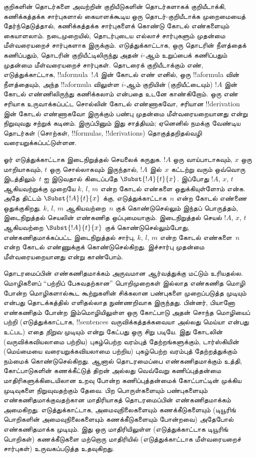 \documentclass[../../../include/open-logic-section]{subfiles}
\begin{document}
குறிகளின் தொடர்களை அவற்றின் குறியீடுகளின் தொடர்களாகக் குறியீடாக்கி,
கணிக்கத்தக்க சார்புகளால் கையாளக்கூடிய ஒரு தொடர்-குறியீடாக்க முறைமையைத்
தேர்ந்தெடுத்தால், கணிக்கத்தக்க சார்புகளைக் கொண்டு கோடல் எண்களையும் கையாளலாம்.
நடைமுறையில், தொடர்புடைய எல்லாச் சார்புகளும் முதன்மை மீள்வரையறைச் சார்புகளாக
இருக்கும். எடுத்துக்காட்டாக, ஒரு தொடரின் நீளத்தைக் கணிப்பதும், தொடரின்
குறியீட்டிலிருந்து அதன் $i$-ஆம் உறுப்பைக் கணிப்பதும் முதன்மை மீள்வரையறைச்
சார்புகள். தொடரைக் குறியீடாக்கும் எண், எடுத்துக்காட்டாக, !!a{formula}~$!A$
இன் கோடல் எண் எனில், ஒரு !!a{formula} வின் நீளத்தையும், அந்த
!!a{formula} விலுள்ள $i$-ஆம்
குறியின் (குறியீட்டையும்) $!A$ இன் கோடல் எண்ணிலிருந்து கணிக்கலாம் என்பதை
உடனே காண்கிறோம். ஒரு எண் சரியாக உருவாக்கப்பட்ட சொல்லின் கோடல் எண்ணாகவோ,
சரியான !!{derivation} இன் கோடல் எண்ணாகவோ இருக்கும் பண்பு முதன்மை
மீள்வரையறையானது என்று நிறுவுவது சற்றுக் கடினம். இருப்பினும் இது சாத்தியம்;
ஏனெனில் நமக்கு வேண்டிய தொடர்கள் (சொற்கள், !!{formula}s,
!!{derivation}s) தொகுத்தறிதல்வழி வரையறுக்கப்பட்டுள்ளன.

ஓர் எடுத்துக்காட்டாக இடைநிறுத்தல் செயலைக் கருதுக. $!A$ ஒரு வாய்பாடாகவும்,
$x$ ஒரு மாறியாகவும், $t$ ஒரு சொல்லாகவும் இருந்தால், $!A$ இல்~$x$ கட்டற்று
வரும் ஒவ்வொரு இடத்திலும்~$t$ ஐ இடுவதால் கிடைப்பதே $\Subst{!A}{t}{x}$.
இப்போது $!A$, $x$, $t$ ஆகியவற்றுக்கு முறையே $k$, $l$, $m$ என்ற கோடல்
எண்களை ஒதுக்கியுள்ளோம் என்க. அதே திட்டம் $\Subst{!A}{t}{x}$ க்கு,
எடுத்துக்காட்டாக~$n$ என்ற கோடல் எண்ணை ஒதுக்குகிறது. $k$, $l$, $m$
ஆகியவற்றை~$n$ குக் கொண்டுசெல்லும் இந்தப் பொருத்தம், இடைநிறுத்தல் செயலின்
எண்கணித ஒப்புமையாகும். இடைநிறுத்தல் செயல் $!A$, $x$, $t$ ஆகியவற்றை
$\Subst{!A}{t}{x}$ குக் கொண்டுசெல்லும்போது, எண்கணிதமாக்கப்பட்ட இடைநிறுத்தல்
சார்பு, $k$, $l$, $m$ என்ற கோடல் எண்களை~$n$ என்ற கோடல் எண்ணுக்குக்
கொண்டுசெல்கிறது. இச்சார்பு முதன்மை மீள்வரையறையானது என்று காண்போம்.

தொடரமைப்பின் எண்கணிதமாக்கம் அருவமான ஆர்வத்துக்கு மட்டும் உரியதல்ல. மொழிகளைப்
``பற்றிப் பேசுவதற்கான'' பொறிமுறைகள் இல்லாத எண்கணித மொழி போன்ற மொழிகளால்கூட
கூற்றுகளின் சிக்கலான பண்புகளை முறைப்படுத்த முடியும் என்பது தொடக்கத்தில்
எளிதல்லாத நுண்ணறிவாக இருந்தது. பின்னர், பியானோ எண்கணிதம் போன்ற இம்மொழியிலுள்ள
ஒரு கோட்பாடு அதன் சொந்த மொழியைப் பற்றி (எடுத்துக்காட்டாக, !!{sentence}s
வருவிக்கத்தக்கவையா அல்லது மெய்யா என்பது உட்பட) எதை \emph{நிறுவ} முடியும்
என்று கேட்பது ஒரு சிறு படியே. இது கோடலின் (வருவிக்கவியலாமை பற்றிய) புகழ்பெற்ற
வரம்புத் தேற்றங்களுக்கும், டார்ஸ்கியின் (மெய்மையை வரையறுக்கவியலாமை பற்றிய)
புகழ்பெற்ற வரம்புத் தேற்றத்துக்கும் நம்மைக் கொண்டுசெல்கிறது. ஆனால் தொடரமைப்பை
எண்கணிதமாக்கும் உத்தி, கோட்பாடுகளின் கணக்கீட்டுத் திறன் அல்லது வெவ்வேறு
கணிப்புத்தன்மை மாதிரிகளுக்கிடையிலான உறவு போன்ற கணிப்புத்தன்மைக் கோட்பாட்டின்
முக்கிய முடிவுகளை நிறுவுவதற்கும் தேவை. பிற பொருள்களையும் பண்புகளையும்
எண்கணிதமாக்குவதற்கான மாதிரியாகத் தொடரமைப்பின் எண்கணிதமாக்கம் அமைகிறது.
எடுத்துக்காட்டாக, அமைவுநிலைகளையும் கணக்கீடுகளையும் (டியூரிங் பொறிகளின்
அமைவுநிலைகளையும் கணக்கீடுகளையும் போன்றவை) அதேபோல் எண்கணிதமாக்க முடியும்.
இது ஒரு மாதிரியிலுள்ள (எடுத்துக்காட்டாக டியூரிங் பொறிகள்) கணக்கீடுகளை மற்றொரு
மாதிரியில் (எடுத்துக்காட்டாக மீள்வரையறைச் சார்புகள்) உருவகப்படுத்த உதவுகிறது.
\end{document}

